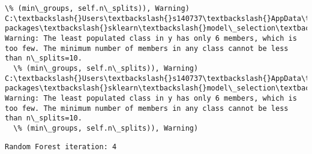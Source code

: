\documentclass[11pt]{article}
\begin{document}
\begin{Verbatim}[commandchars=\\\{\}]
  \% (min\_groups, self.n\_splits)), Warning)
C:\textbackslash{}Users\textbackslash{}s140737\textbackslash{}AppData\textbackslash{}Local\textbackslash{}Continuum\textbackslash{}anaconda3\textbackslash{}lib\textbackslash{}site-packages\textbackslash{}sklearn\textbackslash{}model\_selection\textbackslash{}\_split.py:605: Warning: The least populated class in y has only 6 members, which is too few. The minimum number of members in any class cannot be less than n\_splits=10.
  \% (min\_groups, self.n\_splits)), Warning)
C:\textbackslash{}Users\textbackslash{}s140737\textbackslash{}AppData\textbackslash{}Local\textbackslash{}Continuum\textbackslash{}anaconda3\textbackslash{}lib\textbackslash{}site-packages\textbackslash{}sklearn\textbackslash{}model\_selection\textbackslash{}\_split.py:605: Warning: The least populated class in y has only 6 members, which is too few. The minimum number of members in any class cannot be less than n\_splits=10.
  \% (min\_groups, self.n\_splits)), Warning)

    \end{Verbatim}

    \begin{Verbatim}[commandchars=\\\{\}]
Random Forest iteration: 4 

    \end{Verbatim}
\end{document}
